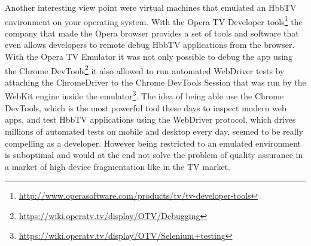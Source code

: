 Another interesting view point were virtual machines that emulated an HbbTV environment on your operating system. With the Opera TV Developer tools\footnote{\url{http://www.operasoftware.com/products/tv/tv-developer-tools}} the company that made the Opera browser provides a set of tools and software that even allows developers to remote debug HbbTV applications from the browser. With the Opera TV Emulator it was not only possible to debug the app using the Chrome DevTools\footnote{\url{https://wiki.operatv.tv/display/OTV/Debugging}} it also allowed to run automated WebDriver tests by attaching the ChromeDriver to the Chrome DevTools Session that was run by the WebKit engine inside the emulator\footnote{\url{https://wiki.operatv.tv/display/OTV/Selenium+testing}}. The idea of being able use the Chrome DevTools, which is the most powerful tool these days to inspect modern web apps, and test HbbTV applications using the WebDriver protocol, which drives millions of automated tests on mobile and desktop every day, seemed to be really compelling as a developer. However being restricted to an emulated environment is suboptimal and would at the end not solve the problem of quality assurance in a market of high device fragmentation like in the TV market.

